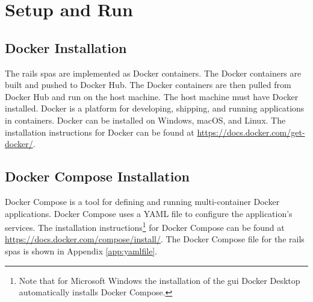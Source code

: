 \chapter{Setup and Run}
\label{ch:installandrun}
\section{Docker Installation}
\label{sec:dockerinstall}
The \gls{rails} \glspl{spa} are implemented as Docker containers. The Docker containers are built and pushed to Docker Hub. The Docker containers are then pulled from Docker Hub and run on the host machine. 
The host machine must have Docker installed. Docker is a platform for developing, shipping, and running applications in containers. Docker can be installed on Windows, macOS, and Linux. 
The installation instructions for Docker can be found at \href{https://docs.docker.com/get-docker/}{https://docs.docker.com/get-docker/}.
\section{Docker Compose Installation}
\label{sec:dockercomposeinstall}
Docker Compose is a tool for defining and running multi-container Docker applications. Docker Compose uses a YAML file to configure the application's services. The installation instructions\footnote{Note that for Microsoft Windows the installation of the \gls{gui} Docker Desktop automatically installs Docker Compose.} for Docker Compose can be found at \href{https://docs.docker.com/compose/install/}{https://docs.docker.com/compose/install/}.  The Docker Compose file for the \gls{rails} \glspl{spa} is shown in Appendix \ref{app:yamlfile}.

